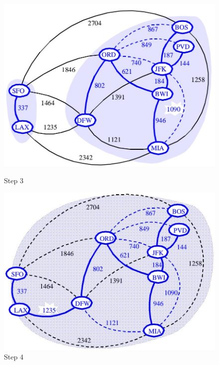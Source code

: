 \begin{figure}[ht!]
	\centering
	\begin{minipage}[t]{0.4\textwidth}
		\centering
		\includegraphics[width=0.9\linewidth]{images/kruskal_s3}
		\caption{Step 3}
		\label{fig:kruskals3}
	\end{minipage}
	\begin{minipage}[t]{0.4\textwidth}
		\centering
		\includegraphics[width=0.9\linewidth]{images/kruskal_s4}
		\caption{Step 4}
		\label{fig:kruskals4}
	\end{minipage}
\end{figure}
\clearpage
